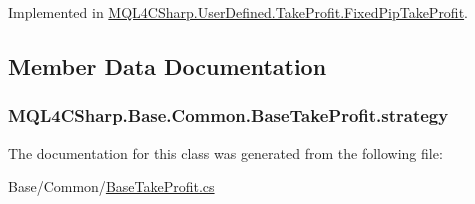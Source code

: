 Implemented in \hyperlink{class_m_q_l4_c_sharp_1_1_user_defined_1_1_take_profit_1_1_fixed_pip_take_profit_a0080f257d1de5eca8b2a6e4056c830a1}{M\+Q\+L4\+C\+Sharp.\+User\+Defined.\+Take\+Profit.\+Fixed\+Pip\+Take\+Profit}.



\subsection{Member Data Documentation}
\subsubsection[{\texorpdfstring{strategy}{strategy}}]{ M\+Q\+L4\+C\+Sharp.\+Base.\+Common.\+Base\+Take\+Profit.\+strategy}\hypertarget{class_m_q_l4_c_sharp_1_1_base_1_1_common_1_1_base_take_profit_a1846f084c91f056e7de1f8e41f7c6625}{}\label{class_m_q_l4_c_sharp_1_1_base_1_1_common_1_1_base_take_profit_a1846f084c91f056e7de1f8e41f7c6625}


The documentation for this class was generated from the following file\+:\begin{DoxyCompactItemize}
\item 
Base/\+Common/\hyperlink{_base_take_profit_8cs}{Base\+Take\+Profit.\+cs}\end{DoxyCompactItemize}
